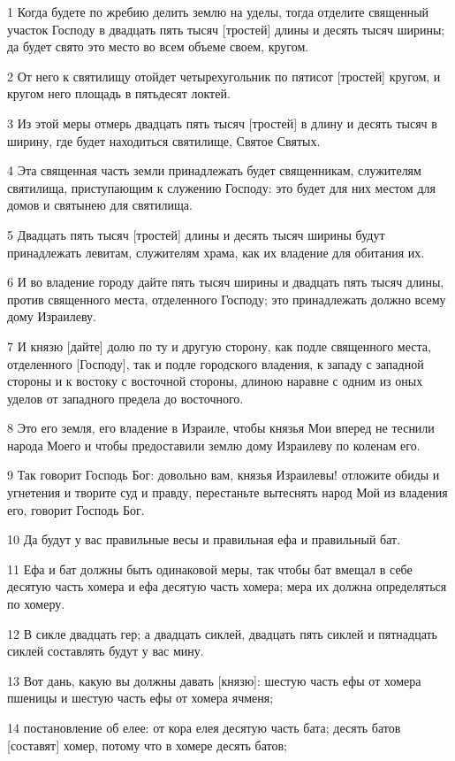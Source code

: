 \par 1 Когда будете по жребию делить землю на уделы, тогда отделите священный участок Господу в двадцать пять тысяч [тростей] длины и десять тысяч ширины; да будет свято это место во всем объеме своем, кругом.
\par 2 От него к святилищу отойдет четырехугольник по пятисот [тростей] кругом, и кругом него площадь в пятьдесят локтей.
\par 3 Из этой меры отмерь двадцать пять тысяч [тростей] в длину и десять тысяч в ширину, где будет находиться святилище, Святое Святых.
\par 4 Эта священная часть земли принадлежать будет священникам, служителям святилища, приступающим к служению Господу: это будет для них местом для домов и святынею для святилища.
\par 5 Двадцать пять тысяч [тростей] длины и десять тысяч ширины будут принадлежать левитам, служителям храма, как их владение для обитания их.
\par 6 И во владение городу дайте пять тысяч ширины и двадцать пять тысяч длины, против священного места, отделенного Господу; это принадлежать должно всему дому Израилеву.
\par 7 И князю [дайте] долю по ту и другую сторону, как подле священного места, отделенного [Господу], так и подле городского владения, к западу с западной стороны и к востоку с восточной стороны, длиною наравне с одним из оных уделов от западного предела до восточного.
\par 8 Это его земля, его владение в Израиле, чтобы князья Мои вперед не теснили народа Моего и чтобы предоставили землю дому Израилеву по коленам его.
\par 9 Так говорит Господь Бог: довольно вам, князья Израилевы! отложите обиды и угнетения и творите суд и правду, перестаньте вытеснять народ Мой из владения его, говорит Господь Бог.
\par 10 Да будут у вас правильные весы и правильная ефа и правильный бат.
\par 11 Ефа и бат должны быть одинаковой меры, так чтобы бат вмещал в себе десятую часть хомера и ефа десятую часть хомера; мера их должна определяться по хомеру.
\par 12 В сикле двадцать гер; а двадцать сиклей, двадцать пять сиклей и пятнадцать сиклей составлять будут у вас мину.
\par 13 Вот дань, какую вы должны давать [князю]: шестую часть ефы от хомера пшеницы и шестую часть ефы от хомера ячменя;
\par 14 постановление об елее: от кора елея десятую часть бата; десять батов [составят] хомер, потому что в хомере десять батов;
